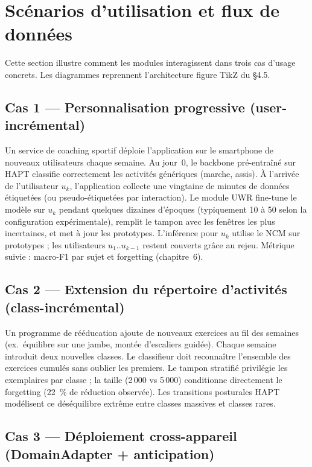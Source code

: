 \section{Scénarios d'utilisation et flux de données}

Cette section illustre comment les modules interagissent dans trois cas d'usage
concrets. Les diagrammes reprennent l'architecture figure TikZ du §4.5.

\subsection{Cas 1 — Personnalisation progressive (user-incrémental)}

Un service de coaching sportif déploie l'application sur le smartphone de nouveaux
utilisateurs chaque semaine. Au jour~0, le backbone pré-entraîné sur HAPT classifie
correctement les activités génériques (marche, assis). À l'arrivée de l'utilisateur
$u_k$, l'application collecte une vingtaine de minutes de données étiquetées (ou
pseudo-étiquetées par interaction). Le module UWR fine-tune le modèle sur $u_k$
pendant quelques dizaines d'époques (typiquement 10 à 50 selon la configuration
expérimentale), remplit le tampon avec les fenêtres les plus incertaines, et
met à jour les prototypes. L'inférence pour $u_k$ utilise le NCM sur prototypes ;
les utilisateurs $u_1..u_{k-1}$ restent couverts grâce au rejeu. Métrique suivie :
macro-F1 par sujet et forgetting (chapitre~6).

\subsection{Cas 2 — Extension du répertoire d'activités (class-incrémental)}

Un programme de rééducation ajoute de nouveaux exercices au fil des semaines
(ex.\ équilibre sur une jambe, montée d'escaliers guidée). Chaque semaine introduit
deux nouvelles classes. Le classifieur doit reconnaître l'ensemble des exercices
cumulés sans oublier les premiers. Le tampon stratifié privilégie les exemplaires
par classe ; la taille (2\,000 vs 5\,000) conditionne directement le forgetting
(22~\% de réduction observée). Les transitions posturales HAPT modélisent ce
déséquilibre extrême entre classes massives et classes rares.

\subsection{Cas 3 — Déploiement cross-appareil (DomainAdapter + anticipation)}

